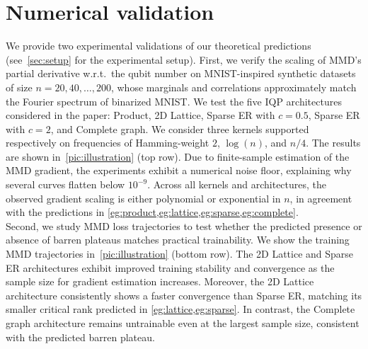 \documentclass{article}
\theoremstyle{plain}
\theoremstyle{definition}
\theoremstyle{remark}
\begin{document}
\section{Numerical validation} \label{sec:numerical-validation}
We provide two experimental validations of our theoretical predictions (see~\cref{sec:setup} for the experimental setup). First, we verify the scaling of MMD's partial derivative w.r.t.~the qubit number on MNIST-inspired synthetic datasets of size $n=20,40,\ldots,200$, whose marginals and correlations approximately match the Fourier spectrum of binarized MNIST. We test the five IQP architectures considered in the paper: Product, 2D Lattice, Sparse ER with $c=0.5$, Sparse ER with $c=2$, and Complete graph. We consider three kernels supported respectively on frequencies of Hamming-weight $2$, $\log(n)$, and $n/4$. The results are shown in~\cref{pic:illustration} (top row). Due to finite-sample estimation of the MMD gradient, the experiments exhibit a numerical noise floor, explaining why several curves flatten below $10^{-9}$. Across all kernels and architectures, the observed gradient scaling is either polynomial or exponential in $n$, in agreement with the predictions in \cref{eg:product,eg:lattice,eg:sparse,eg:complete}. \\
Second, we study MMD loss trajectories to test whether the predicted presence or absence of barren plateaus matches practical trainability. We show the training MMD trajectories in~\cref{pic:illustration} (bottom row). The 2D Lattice and Sparse ER architectures exhibit improved training stability and convergence as the sample size for gradient estimation increases. Moreover, the 2D Lattice architecture consistently shows a faster convergence than Sparse ER, matching its smaller critical rank predicted in \cref{eg:lattice,eg:sparse}. In contrast, the Complete graph architecture remains untrainable even at the largest sample size, consistent with the predicted barren plateau.
   
\end{document}
